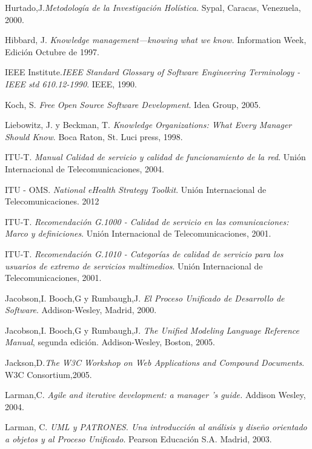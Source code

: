 \begin{thebibliography}{}
 Hurtado,J.\textit{Metodología de la Investigación Holística.} Sypal, Caracas, Venezuela, 2000.

 Hibbard, J. \textit{Knowledge management—knowing what we know.} Information Week, Edición Octubre de 1997.

 IEEE Institute.\textit{IEEE Standard Glossary of Software Engineering Terminology - IEEE std 610.12-1990}. IEEE, 1990.

 Koch, S. \textit{Free Open Source Software Development}. Idea Group, 2005.

 Liebowitz, J. y Beckman, T. \textit{Knowledge Organizations: What Every Manager Should Know}. Boca Raton, St. Luci press, 1998.

 ITU-T. \textit{Manual Calidad de servicio y calidad de funcionamiento de la red}. Unión Internacional de Telecomunicaciones, 2004.

 ITU - OMS. \textit{National eHealth Strategy Toolkit}. Unión Internacional de Telecomunicaciones. 2012 


 ITU-T. \textit{Recomendación G.1000 - Calidad de servicio en las comunicaciones: Marco y definiciones}. Unión Internacional de Telecomunicaciones, 2001.

 ITU-T. \textit{Recomendación G.1010 - Categorías de calidad de servicio para los usuarios de extremo de servicios multimedios}. Unión Internacional de Telecomunicaciones, 2001.

 Jacobson,I. Booch,G y Rumbaugh,J. \textit{El Proceso Unificado de Desarrollo de Software}. Addison-Wesley, Madrid, 2000.

 Jacobson,I. Booch,G y Rumbaugh,J. \textit{The Unified Modeling Language Reference Manual}, segunda edición. Addison-Wesley, Boston, 2005.

 Jackson,D.\textit{The W3C Workshop on Web Applications and Compound Documents}. W3C Consortium,2005.

 Larman,C. \textit{Agile and iterative development: a manager ’s guide.} Addison Wesley, 2004.

 Larman, C. \textit{UML y PATRONES. Una introducción al análisis y diseño orientado a objetos y al Proceso Unificado}. Pearson Educación S.A. Madrid, 2003.


\end{thebibliography}
